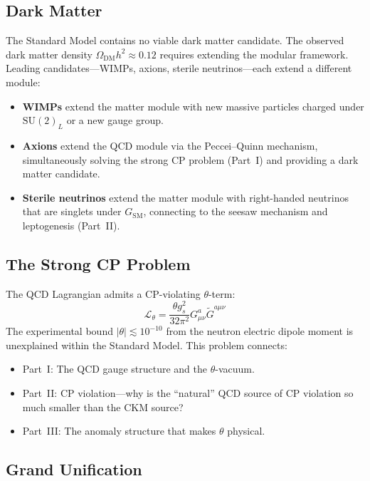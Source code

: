\documentclass[12pt]{article}
\theoremstyle{definition}
\theoremstyle{remark}
\newcommand{\Lagr}{\mathcal{L}}
\newcommand{\su}[1]{\mathrm{SU}(#1)}
\begin{document}
\subsection{Dark Matter}

The Standard Model contains no viable dark matter candidate. The observed dark matter density $\Omega_{\mathrm{DM}}h^2 \approx 0.12$ requires extending the modular framework. Leading candidates---WIMPs, axions, sterile neutrinos---each extend a different module:

\begin{itemize}
\item \textbf{WIMPs} extend the matter module with new massive particles charged under $\su{2}_L$ or a new gauge group.
\item \textbf{Axions} extend the QCD module via the Peccei--Quinn mechanism, simultaneously solving the strong CP problem (Part~I) and providing a dark matter candidate.
\item \textbf{Sterile neutrinos} extend the matter module with right-handed neutrinos that are singlets under $G_{\mathrm{SM}}$, connecting to the seesaw mechanism and leptogenesis (Part~II).
\end{itemize}

\subsection{The Strong CP Problem}

The QCD Lagrangian admits a CP-violating $\theta$-term:
\begin{equation}
\Lagr_\theta = \frac{\theta g_s^2}{32\pi^2}G^a_{\mu\nu}\widetilde{G}^{a\mu\nu}
\end{equation}
The experimental bound $|\theta| \lesssim 10^{-10}$ from the neutron electric dipole moment is unexplained within the Standard Model. This problem connects:
\begin{itemize}
\item Part~I: The QCD gauge structure and the $\theta$-vacuum.
\item Part~II: CP violation---why is the ``natural'' QCD source of CP violation so much smaller than the CKM source?
\item Part~III: The anomaly structure that makes $\theta$ physical.
\end{itemize}

\subsection{Grand Unification}
\end{document}
